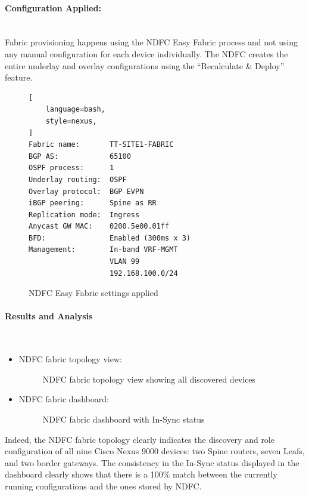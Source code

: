 \paragraph{Configuration Applied:}~\\
Fabric provisioning happens using the NDFC Easy Fabric process and not using any manual configuration for each device individually. The NDFC creates the entire underlay and overlay configurations using the “Recalculate \& Deploy” feature.

\begin{figure}[!htbp]
\centering
\begin{lstlisting}[
    language=bash,
    style=nexus,
]
Fabric name:       TT-SITE1-FABRIC
BGP AS:            65100
OSPF process:      1
Underlay routing:  OSPF
Overlay protocol:  BGP EVPN
iBGP peering:      Spine as RR
Replication mode:  Ingress
Anycast GW MAC:    0200.5e00.01ff
BFD:               Enabled (300ms x 3)
Management:        In-band VRF-MGMT
                   VLAN 99
                   192.168.100.0/24
\end{lstlisting}
\caption{NDFC Easy Fabric settings applied}
\label{fig:scenario7-easy-fabric}
\end{figure}

\paragraph{Results and Analysis}~\\
\begin{itemize}
    \item []NDFC fabric topology view:
    \begin{figure}[!htbp]
        \centering
        \fabric
        \caption{NDFC fabric topology view showing all discovered devices}
        \label{fig:ndfc-topology}
    \end{figure}
    \item []NDFC fabric dashboard:
    \begin{figure}[!htbp]
        \centering
        \fabricdash
        \caption{NDFC fabric dashboard with In-Sync status}
        \label{fig:ndfc-dashboard}
    \end{figure}
\end{itemize}
Indeed, the NDFC fabric topology clearly indicates the discovery and role configuration of all nine Cisco Nexus 9000 devices: two Spine routers, seven Leafs, and two border gateways. The consistency in the In-Sync status displayed in the dashboard clearly shows that there is a 100\% match between the currently running configurations and the ones stored by NDFC.

